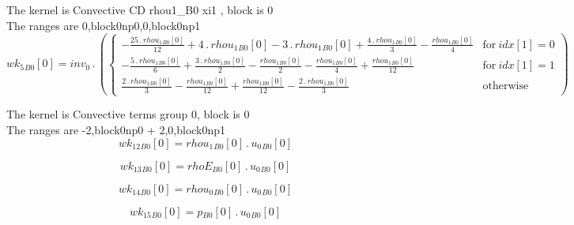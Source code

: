 \documentclass{article}
\begin{document}
\noindent The kernel is Convective CD rhou1_B0 xi1 , block is 0\\\noindent The ranges are 0,block0np0,0,block0np1\\\begin{dmath}{wk_{5}{_{B0}}}[{0}] = inv_0 \,.\, \left(\begin{cases} - \frac{25 \,.\, {rhou_{1}{_{B0}}}[{0}]}{12} + 4 \,.\, {rhou_{1}{_{B0}}}[{0}] - 3 \,.\, {rhou_{1}{_{B0}}}[{0}] + \frac{4 \,.\, {rhou_{1}{_{B0}}}[{0}]}{3} - 
\frac{{rhou_{1}{_{B0}}}[{0}]}{4} & \text{for}\: {idx}[{1}] = 0 \\- \frac{5 \,.\, {rhou_{1}{_{B0}}}[{0}]}{6} + \frac{3 \,.\, {rhou_{1}{_{B0}}}[{0}]}{2} - \frac{{rhou_{1}{_{B0}}}[{0}]}{2} - \frac{{rhou_{1}{_{B0}}}[{0}]}{4} + 
\frac{{rhou_{1}{_{B0}}}[{0}]}{12} & \text{for}\: {idx}[{1}] = 1 \\\frac{2 \,.\, {rhou_{1}{_{B0}}}[{0}]}{3} - \frac{{rhou_{1}{_{B0}}}[{0}]}{12} + \frac{{rhou_{1}{_{B0}}}[{0}]}{12} - \frac{2 \,.\, {rhou_{1}{_{B0}}}[{0}]}{3} & \text{otherwise} 
\end{cases}\right)\end{dmath}

\noindent The kernel is Convective terms group 0, block is 0\\\noindent The ranges are -2,block0np0 + 2,0,block0np1\\\begin{dmath}{wk_{12}{_{B0}}}[{0}] = {rhou_{1}{_{B0}}}[{0}] \,.\, {u_{0}{_{B0}}}[{0}]\end{dmath}

\begin{dmath}{wk_{13}{_{B0}}}[{0}] = {rhoE{_{B0}}}[{0}] \,.\, {u_{0}{_{B0}}}[{0}]\end{dmath}

\begin{dmath}{wk_{14}{_{B0}}}[{0}] = {rhou_{0}{_{B0}}}[{0}] \,.\, {u_{0}{_{B0}}}[{0}]\end{dmath}

\begin{dmath}{wk_{15}{_{B0}}}[{0}] = {p{_{B0}}}[{0}] \,.\, {u_{0}{_{B0}}}[{0}]\end{dmath}
\end{document}
